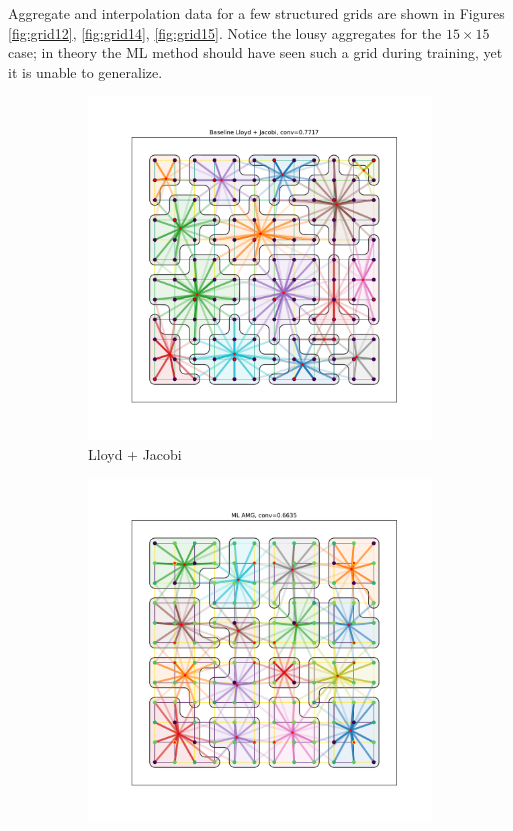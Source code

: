 \documentclass{article}
\begin{document}
Aggregate and interpolation data for a few structured grids are shown in Figures \ref{fig:grid12}, \ref{fig:grid14}, \ref{fig:grid15}.  Notice the lousy aggregates for the $15\times 15$ case; in theory the ML method should have seen such a grid during training, yet it is unable to generalize.
\begin{figure}[h]
  \centering
  \begin{subfigure}[t]{0.49\textwidth}
    \centering
    \includegraphics[width=\textwidth]{grid_12_lloyd.pdf}
    \caption{Lloyd + Jacobi}
  \end{subfigure}
  \begin{subfigure}[t]{0.49\textwidth}
    \centering
    \includegraphics[width=\textwidth]{grid_12_ml.pdf}

\end{subfigure}
\end{figure}
\end{document}
